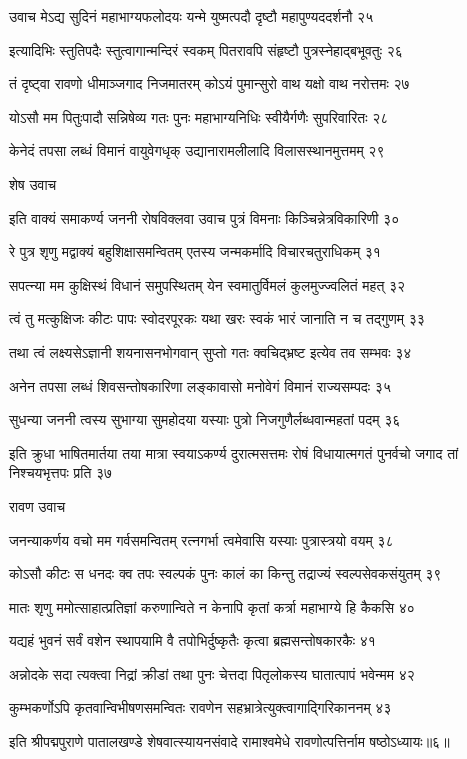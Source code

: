 उवाच मेऽद्य सुदिनं महाभाग्यफलोदयः
यन्मे युष्मत्पदौ दृष्टौ महापुण्यददर्शनौ २५

इत्यादिभिः स्तुतिपदैः स्तुत्वागान्मन्दिरं स्वकम्
पितरावपि संहृष्टौ पुत्रस्नेहाद्बभूवतुः २६

तं दृष्ट्वा रावणो धीमाञ्जगाद निजमातरम्
कोऽयं पुमान्सुरो वाथ यक्षो वाथ नरोत्तमः २७

योऽसौ मम पितुःपादौ सन्निषेव्य गतः पुनः
महाभाग्यनिधिः स्वीयैर्गणैः सुपरिवारितः २८

केनेदं तपसा लब्धं विमानं वायुवेगधृक्
उद्यानारामलीलादि विलासस्थानमुत्तमम् २९

शेष उवाच

इति वाक्यं समाकर्ण्य जननी रोषविक्लवा
उवाच पुत्रं विमनाः किञ्चिन्नेत्रविकारिणी ३०

रे पुत्र शृणु मद्वाक्यं बहुशिक्षासमन्वितम्
एतस्य जन्मकर्मादि विचारचतुराधिकम् ३१

सपत्न्या मम कुक्षिस्थं विधानं समुपस्थितम्
येन स्वमातुर्विमलं कुलमुज्ज्वलितं महत् ३२

त्वं तु मत्कुक्षिजः कीटः पापः स्वोदरपूरकः
यथा खरः स्वकं भारं जानाति न च तद्गुणम् ३३

तथा त्वं लक्ष्यसेऽज्ञानी शयनासनभोगवान्
सुप्तो गतः क्वचिद्भ्रष्ट इत्येव तव सम्भवः ३४

अनेन तपसा लब्धं शिवसन्तोषकारिणा
लङ्कावासो मनोवेगं विमानं राज्यसम्पदः ३५

सुधन्या जननी त्वस्य सुभाग्या सुमहोदया
यस्याः पुत्रो निजगुणैर्लब्धवान्महतां पदम् ३६

इति क्रुधा भाषितमार्तया तया मात्रा स्वयाऽकर्ण्य दुरात्मसत्तमः
रोषं विधायात्मगतं पुनर्वचो जगाद तां निश्चयभृत्तपः प्रति ३७

रावण उवाच

जनन्याकर्णय वचो मम गर्वसमन्वितम्
रत्नगर्भा त्वमेवासि यस्याः पुत्रास्त्रयो वयम् ३८

कोऽसौ कीटः स धनदः क्व तपः स्वल्पकं पुनः
कालं का किन्तु तद्राज्यं स्वल्पसेवकसंयुतम् ३९

मातः शृणु ममोत्साहात्प्रतिज्ञां करुणान्विते
न केनापि कृतां कर्त्रा महाभाग्ये हि कैकसि ४०

यद्यहं भुवनं सर्वं वशेन स्थापयामि वै
तपोभिर्दुष्कृतैः कृत्वा ब्रह्मसन्तोषकारकैः ४१

अन्नोदके सदा त्यक्त्वा निद्रां क्रीडां तथा पुनः
चेत्तदा पितृलोकस्य घातात्पापं भवेन्मम ४२

कुम्भकर्णोऽपि कृतवान्विभीषणसमन्वितः
रावणेन सहभ्रात्रेत्युक्त्वागाद्गिरिकाननम् ४३

इति श्रीपद्मपुराणे पातालखण्डे शेषवात्स्यायनसंवादे रामाश्वमेधे रावणोत्पत्तिर्नाम षष्ठोऽध्यायः॥६॥

